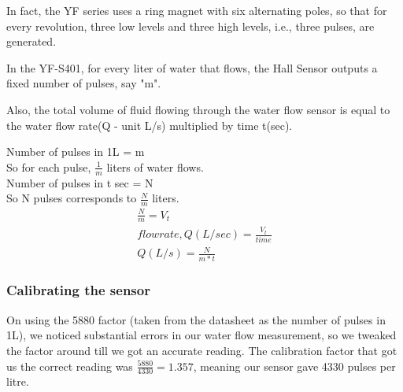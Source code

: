 \documentclass[12pt]{article}
\begin{document}
In fact, the YF series uses a ring magnet with six alternating poles, so that for every revolution, three low levels and three high levels, i.e., three pulses, are generated.

In the YF-S401, for every liter of water that flows, the Hall Sensor outputs  a fixed number of pulses, say "m". 

Also, the total volume of fluid flowing through the water flow sensor is equal to the water flow rate(Q - unit L/s) multiplied by time t(sec).

  Number of pulses in 1L = m\\
  So for each pulse, $\frac{1}{m}$ liters of water flows.\\
  Number of pulses in t sec = N\\
  So N pulses corresponds to $\frac{N}{m}$ liters.\\
  

\begin{gather*}
     \frac{N}{m} = V_t \\
      flow rate, Q(L/sec) = \frac{V_t}{time} \\
      Q(L/s)=\frac{N}{m*t}
\end{gather*}

\subsubsection*{Calibrating the sensor}
On using the 5880 factor (taken from the datasheet as the number of pulses in 1L), we noticed substantial errors in our water flow measurement, so we tweaked the factor around till we got an accurate reading.
The calibration factor that got us the correct reading was $\frac{5880}{4330} = 1.357$, meaning our sensor gave 4330 pulses per litre.
\end{document}
